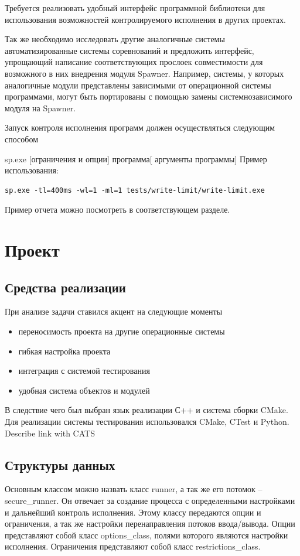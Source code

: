\documentclass{imcs}
\begin{document}
Требуется реализовать удобный интерфейс программной библиотеки для использования возможностей контролируемого исполнения в других проектах.

Так же необходимо исследовать другие аналогичные системы автоматизированные системы соревнований и предложить интерфейс, упрощающий написание соответствующих прослоек совместимости для возможного в них внедрения модуля Spawner. Например, системы, у которых аналогичные модули представлены зависимыми от операционной системы программами, могут быть портированы с помощью замены системнозависимого модуля на Spawner.

Запуск контроля исполнения программ должен осуществляться следующим способом

sp.exe [ограничения и опции] программа[ аргументы программы]
Пример использования:

\begin{lstlisting}
sp.exe -tl=400ms -wl=1 -ml=1 tests/write-limit/write-limit.exe
\end{lstlisting}

Пример отчета можно посмотреть в соответствующем разделе.

\section{Проект}

\subsection{Средства реализации}

При анализе задачи ставился акцент на следующие моменты
\begin{itemize}
	\item	переносимость проекта на другие операционные системы
	\item	гибкая настройка проекта
	\item	интеграция с системой тестирования
	\item	удобная система объектов и модулей
\end{itemize}
В следствие чего был выбран язык реализации С++ и система сборки CMake. Для реализации системы тестирования использовался CMake, CTest и Python.
Describe link with CATS


\subsection{Структуры данных}

Основным классом можно назвать класс runner, а так же его потомок – secure\_runner.
Он отвечает за создание процесса с определенными настройками и дальнейший контроль исполнения. Этому классу передаются опции и ограничения, а так же настройки перенаправления потоков ввода/вывода.
Опции представляют собой класс options\_class, полями которого являются настройки исполнения.
Ограничения представляют собой класс restrictions\_class.
\end{document}

